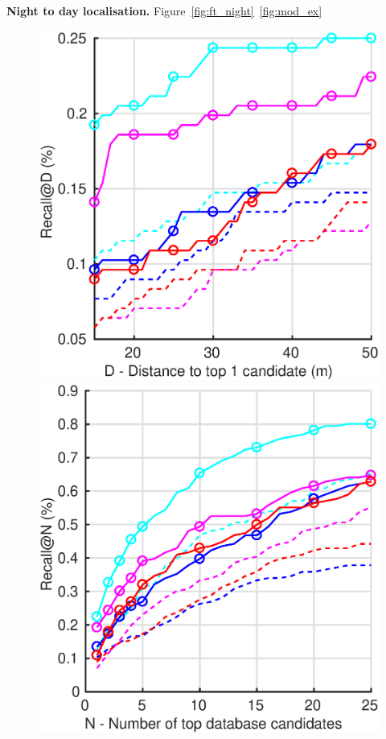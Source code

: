 \noindent\textbf{Night to day localisation.} Figure~\ref{fig:ft_night}~\ref{fig:mod_ex}
\begin{figure}
	\center
	\begin{minipage}{0.49\linewidth}
		\includegraphics[width=\linewidth]{plot/fig/nightft_distance}	
	\end{minipage}
	\begin{minipage}{0.49\linewidth}
		\includegraphics[width=\linewidth]{plot/fig/nightft_recall}	
	\end{minipage}
	

\end{figure}

